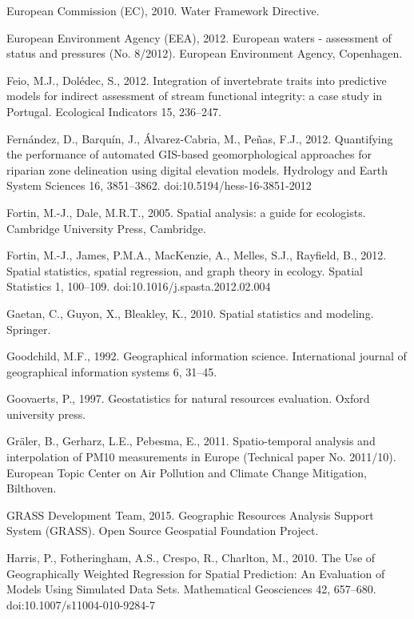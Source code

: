 \begin{thebibliography}
\bibitem{} \hangindent=1cm European Commission (EC), 2010. Water Framework Directive.

\bibitem{} \hangindent=1cm European Environment Agency (EEA), 2012. European waters - assessment of status and pressures (No. 8/2012). European Environment Agency, Copenhagen.

\bibitem{} \hangindent=1cm Feio, M.J., Dolédec, S., 2012. Integration of invertebrate traits into predictive models for indirect assessment of stream functional integrity: a case study in Portugal. Ecological Indicators 15, 236–247.

\bibitem{} \hangindent=1cm Fernández, D., Barquín, J., Álvarez-Cabria, M., Peñas, F.J., 2012. Quantifying the performance of automated GIS-based geomorphological approaches for riparian zone delineation using digital elevation models. Hydrology and Earth System Sciences 16, 3851–3862. doi:10.5194/hess-16-3851-2012

\bibitem{} \hangindent=1cm Fortin, M.-J., Dale, M.R.T., 2005. Spatial analysis: a guide for ecologists. Cambridge University Press, Cambridge.

\bibitem{} \hangindent=1cm Fortin, M.-J., James, P.M.A., MacKenzie, A., Melles, S.J., Rayfield, B., 2012. Spatial statistics, spatial regression, and graph theory in ecology. Spatial Statistics 1, 100–109. doi:10.1016/j.spasta.2012.02.004

\bibitem{} \hangindent=1cm Gaetan, C., Guyon, X., Bleakley, K., 2010. Spatial statistics and modeling. Springer.

\bibitem{} \hangindent=1cm Goodchild, M.F., 1992. Geographical information science. International journal of geographical information systems 6, 31–45.

\bibitem{} \hangindent=1cm Goovaerts, P., 1997. Geostatistics for natural resources evaluation. Oxford university press.

\bibitem{} \hangindent=1cm Gräler, B., Gerharz, L.E., Pebesma, E., 2011. Spatio-temporal analysis and interpolation of PM10 measurements in Europe (Technical paper No. 2011/10). European Topic Center on Air Pollution and Climate Change Mitigation, Bilthoven.

\bibitem{} \hangindent=1cm GRASS Development Team, 2015. Geographic Resources Analysis Support System (GRASS). Open Source Geospatial Foundation Project.

\bibitem{} \hangindent=1cm Harris, P., Fotheringham, A.S., Crespo, R., Charlton, M., 2010. The Use of Geographically Weighted Regression for Spatial Prediction: An Evaluation of Models Using Simulated Data Sets. Mathematical Geosciences 42, 657–680. doi:10.1007/s11004-010-9284-7


\end{thebibliography}

